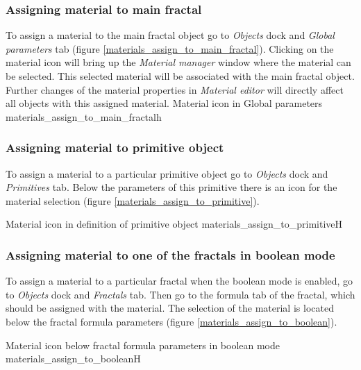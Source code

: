 \subsubsection{Assigning material to main fractal}\label{assigning-material-to-main-fractal}

To assign a material to the main fractal object go to \emph{Objects} dock and \emph{Global parameters} tab (figure \ref{materials_assign_to_main_fractal}). Clicking on the material icon will bring up the \emph{Material manager} window where the material can be selected. This selected material will be associated with the main fractal object. Further changes of the material properties in \emph{Material editor} will directly affect all objects with this assigned material.
\nopagebreak
{}
{Material icon in Global parameters}
{materials_assign_to_main_fractal}{h}

\subsubsection{Assigning material to primitive object}\label{assigning-material-to-primitive}

To assign a material to a particular primitive object go to \emph{Objects} dock and \emph{Primitives} tab. Below the parameters of this primitive there is an icon for the material selection (figure \ref{materials_assign_to_primitive}).
 
\nopagebreak
{}
{Material icon in definition of primitive object}
{materials_assign_to_primitive}{H}

\subsubsection{Assigning material to one of the fractals in boolean mode}\label{assigning-material-to-boolean}

To assign a material to a particular fractal when the boolean mode is enabled, go to \emph{Objects} dock and \emph{Fractals} tab. Then go to the formula tab of the fractal, which should be assigned with the material. The selection of the material is located below the fractal formula parameters (figure \ref{materials_assign_to_boolean}).

\nopagebreak
{}
{Material icon below fractal formula parameters in boolean mode}
{materials_assign_to_boolean}{H}

